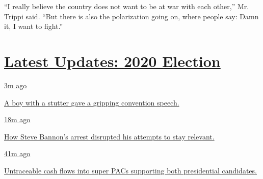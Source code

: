 ``I really believe the country does not want to be at war with each
other,'' Mr. Trippi said. ``But there is also the polarization going on,
where people say: Damn it, I want to fight.''

\hypertarget{latest-updates-2020-election}{%
\section{\texorpdfstring{\href{https://www.nytimes3xbfgragh.onion/live/2020/08/21/us/dnc-convention-election?action=click\&pgtype=Article\&state=default\&region=MAIN_CONTENT_1\&context=storylines_live_updates}{Latest
Updates: 2020
Election}}{Latest Updates: 2020 Election}}\label{latest-updates-2020-election}}

\href{https://www.nytimes3xbfgragh.onion/live/2020/08/21/us/dnc-convention-election?action=click\&pgtype=Article\&state=default\&region=MAIN_CONTENT_1\&context=storylines_live_updates\#a-boy-with-a-stutter-gave-a-gripping-convention-speech}{3m
ago}

\href{https://www.nytimes3xbfgragh.onion/live/2020/08/21/us/dnc-convention-election?action=click\&pgtype=Article\&state=default\&region=MAIN_CONTENT_1\&context=storylines_live_updates\#a-boy-with-a-stutter-gave-a-gripping-convention-speech}{A
boy with a stutter gave a gripping convention speech.}

\href{https://www.nytimes3xbfgragh.onion/live/2020/08/21/us/dnc-convention-election?action=click\&pgtype=Article\&state=default\&region=MAIN_CONTENT_1\&context=storylines_live_updates\#how-steve-bannons-arrest-disrupted-his-attempts-to-stay-relevant}{18m
ago}

\href{https://www.nytimes3xbfgragh.onion/live/2020/08/21/us/dnc-convention-election?action=click\&pgtype=Article\&state=default\&region=MAIN_CONTENT_1\&context=storylines_live_updates\#how-steve-bannons-arrest-disrupted-his-attempts-to-stay-relevant}{How
Steve Bannon's arrest disrupted his attempts to stay relevant.}

\href{https://www.nytimes3xbfgragh.onion/live/2020/08/21/us/dnc-convention-election?action=click\&pgtype=Article\&state=default\&region=MAIN_CONTENT_1\&context=storylines_live_updates\#untraceable-cash-flows-into-super-pacs-supporting-both-presidential-candidates}{41m
ago}

\href{https://www.nytimes3xbfgragh.onion/live/2020/08/21/us/dnc-convention-election?action=click\&pgtype=Article\&state=default\&region=MAIN_CONTENT_1\&context=storylines_live_updates\#untraceable-cash-flows-into-super-pacs-supporting-both-presidential-candidates}{Untraceable
cash flows into super PACs supporting both presidential candidates.}

